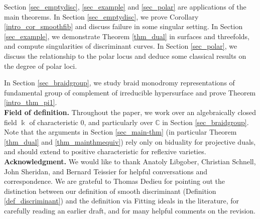 \documentclass[12pt]{amsart}
\newcommand{\C}{\mathbb{C}} %
\begin{document}
Section \ref{sec_emptydisc}, \ref{sec_example} and \ref{sec_polar} are applications of the main theorems.
In Section \ref{sec_emptydisc}, we prove Corollary \ref{intro_cor_smoothfib} and discuss failure in some singular setting. In Section \ref{sec_example}, we demonstrate Theorem \ref{thm_dual} in surfaces and threefolds, and compute singularities of discriminant curves. In Section \ref{sec_polar}, we discuss the relationship to the polar locus and deduce some classical results on the degree of polar loci. 





In Section \ref{sec_braidgroup}, we study braid monodromy representations of fundamental group of complement of irreducible hypersurface and prove Theorem \ref{intro_thm_pi1}.
\\
 
 \noindent\textbf{Field of definition.} Throughout the paper, we work over an algebraically closed field $\Bbbk$ of characteristic $0$, and particularly over $\C$ in Section \ref{sec_braidgroup}. Note that the arguments in Section \ref{sec_main-thm} (in particular Theorem \ref{thm_dual} and \ref{thm_mainthmequiv}) rely only on biduality for projective duals, and should extend to positive characteristic for reflexive varieties. \\
 
\noindent\textbf{Acknowledgment.}  We would like to thank Anatoly Libgober, Christian Schnell, John Sheridan, and Bernard Teissier for helpful conversations and correspondence. We are grateful to Thomas Dedieu for pointing out the distinction between our definition of smooth discriminant (Definition \ref{def_discriminant}) and the definition via Fitting ideals in the literature, for carefully reading an earlier draft, and for many helpful comments on the revision. 
\end{document}
